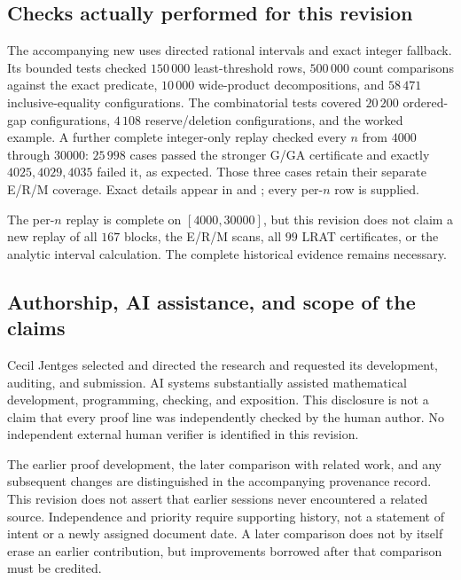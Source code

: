 \subsection{Checks actually performed for this revision}
The accompanying new  uses directed rational intervals and exact integer fallback. Its bounded tests checked $150\,000$ least-threshold rows, $500\,000$ count comparisons against the exact predicate, $10\,000$ wide-product decompositions, and $58\,471$ inclusive-equality configurations. The combinatorial tests covered $20\,200$ ordered-gap configurations, $4\,108$ reserve/deletion configurations, and the worked example. A further complete integer-only replay checked every $n$ from $4000$ through $30000$: $25\,998$ cases passed the stronger G/GA certificate and exactly $4025,4029,4035$ failed it, as expected. Those three cases retain their separate E/R/M coverage. Exact details appear in  and ; every per-$n$ row is supplied.

The per-$n$ replay is complete on $[4000,30000]$, but this revision does not claim a new replay of all $167$ blocks, the E/R/M scans, all $99$ LRAT certificates, or the analytic interval calculation. The complete historical evidence remains necessary.

\subsection{Authorship, AI assistance, and scope of the claims}
Cecil Jentges selected and directed the research and requested its development, auditing, and submission. AI systems substantially assisted mathematical development, programming, checking, and exposition. This disclosure is not a claim that every proof line was independently checked by the human author. No independent external human verifier is identified in this revision.

The earlier proof development, the later comparison with related work, and any subsequent changes are distinguished in the accompanying provenance record. This revision does not assert that earlier sessions never encountered a related source. Independence and priority require supporting history, not a statement of intent or a newly assigned document date. A later comparison does not by itself erase an earlier contribution, but improvements borrowed after that comparison must be credited.
